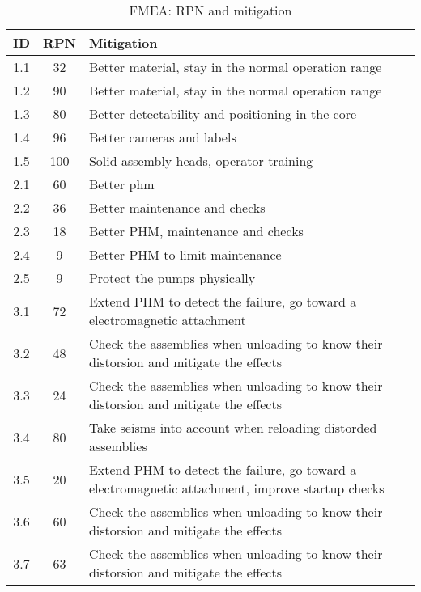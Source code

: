 \begin{table}[!htb]
    \centering
        \begin{tabular}{ccp{10cm}}
        \hline
        ID & RPN & Mitigation \\ \hline\hline
        1.1 & 32 & Better material, stay in the normal operation range \\
        1.2 & 90 & Better material, stay in the normal operation range \\
        1.3 & 80 & Better detectability and positioning in the core \\
        1.4 & 96 & Better cameras and labels \\
        1.5 & 100 & Solid assembly heads, operator training \\
        2.1 & 60 & Better \gls{phm} \\
        2.2 & 36 & Better maintenance and checks \\
        2.3 & 18 & Better PHM, maintenance and checks \\
        2.4 & 9 & Better PHM to limit maintenance \\
        2.5 & 9 & Protect the pumps physically \\
        3.1 & 72 & Extend PHM to detect the failure, go toward a electromagnetic attachment \\
        3.2 & 48 & Check the assemblies when unloading to know their distorsion and mitigate the effects \\
        3.3 & 24 & Check the assemblies when unloading to know their distorsion and mitigate the effects \\
        3.4 & 80 & Take seisms into account when reloading distorded assemblies \\
        3.5 & 20 & Extend PHM to detect the failure, go toward a electromagnetic attachment, improve startup checks \\
        3.6 & 60 & Check the assemblies when unloading to know their distorsion and mitigate the effects \\
        3.7 & 63 & Check the assemblies when unloading to know their distorsion and mitigate the effects \\
        \end{tabular}
        \caption{FMEA: RPN and mitigation}\label{tab:fmea_rpn_risk}
\end{table}




